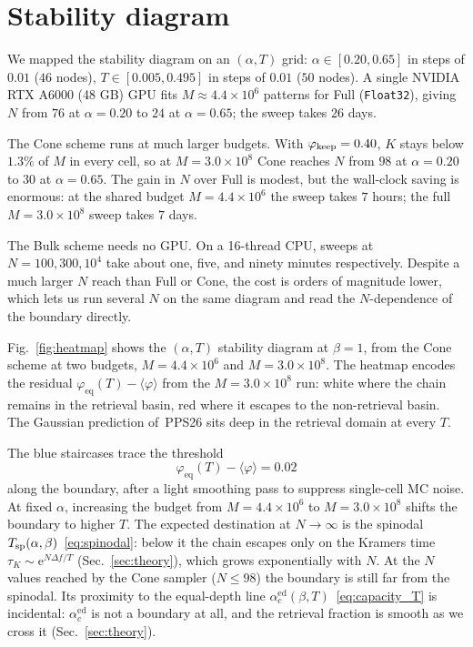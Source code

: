 \documentclass[letterpaper]{article} %
\newcommand{\e}{{\mathrm{e}}}
\newcommand{\Bnet}{\beta}
\newcommand{\acEd}{\alpha_c^{\mathrm{ed}}}
\begin{document}

\section{Stability diagram}
\label{sec:results}

We mapped the stability diagram
on an $(\alpha, T)$ grid: $\alpha \in [0.20, 0.65]$ in steps of $0.01$ ($46$ nodes), $T \in [0.005, 0.495]$ in steps of $0.01$ ($50$ nodes). A single NVIDIA RTX A6000 (48 GB) GPU fits $M \approx 4.4 \times 10^6$ patterns for Full (\texttt{Float32}), giving $N$ from $76$ at $\alpha = 0.20$ to $24$ at $\alpha = 0.65$; the sweep takes $26$ days.

The Cone scheme runs at much larger budgets. With $\varphi_{\rm keep} = 0.40$, $K$ stays below $1.3\%$ of $M$ in every cell, so at $M = 3.0 \times 10^8$ Cone reaches $N$ from $98$ at $\alpha = 0.20$ to $30$ at $\alpha = 0.65$. The gain in $N$ over Full is modest, but the wall-clock saving is enormous: at the shared budget $M = 4.4 \times 10^6$ the sweep takes $7$ hours; the full $M = 3.0 \times 10^8$ sweep takes $7$ days.

The Bulk scheme needs no GPU. On a 16-thread CPU, sweeps at $N = 100, 300, 10^4$ take about one, five, and ninety minutes respectively. Despite a much larger $N$ reach than Full or Cone, the cost is orders of magnitude lower, which lets us run several $N$ on the same diagram and read the $N$-dependence of the boundary directly. 



Fig.~\ref{fig:heatmap} shows the $(\alpha, T)$ stability diagram at $\Bnet = 1$, from the Cone scheme at two budgets, $M = 4.4 \times 10^6$ and $M = 3.0 \times 10^8$. The heatmap encodes the residual $\varphi_{\mathrm{eq}}(T) - \langle\varphi\rangle$ from the $M = 3.0 \times 10^8$ run: white where the chain remains in the retrieval basin, red where it escapes to the non-retrieval basin. The Gaussian prediction of~PPS26 sits deep in the retrieval domain at every $T$.

The blue staircases trace the threshold
\begin{equation}
    \varphi_{\mathrm{eq}}(T) - \langle\varphi\rangle = 0.02
    \label{eq:threshold}
\end{equation}
along the boundary, after a light smoothing pass to suppress single-cell MC noise.
At fixed $\alpha$, increasing the budget from $M = 4.4 \times 10^6$ to $M = 3.0 \times 10^8$ shifts the boundary to higher $T$. The expected destination at $N \to \infty$ is the spinodal $T_{\rm sp}(\alpha, \Bnet)$~\eqref{eq:spinodal}: below it the chain escapes only on the Kramers time $\tau_K \sim \e^{N \Delta f / T}$ (Sec.~\ref{sec:theory}), which grows exponentially with $N$. At the $N$ values reached by the Cone sampler ($N \leq 98$) the boundary is still far from the spinodal. Its proximity to the equal-depth line $\acEd(\Bnet, T)$~\eqref{eq:capacity_T} is incidental: $\acEd$ is not a boundary at all, and the retrieval fraction is smooth as we cross it (Sec.~\ref{sec:theory}). 
\end{document}
